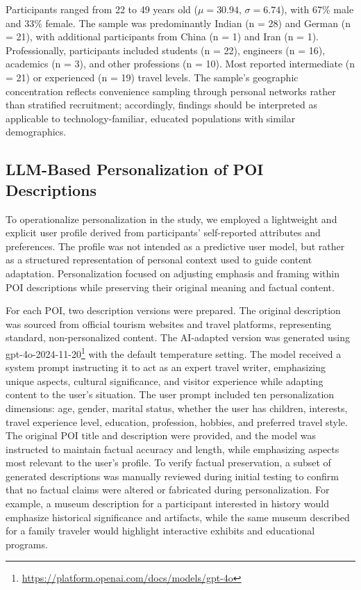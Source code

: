 Participants ranged from 22 to 49 years old ($\mu = 30.94$, $\sigma = 6.74$), with 67\% male and 33\% female. The sample was predominantly Indian (n = 28) and German (n = 21), with additional participants from China (n = 1) and Iran (n = 1). Professionally, participants included students (n = 22), engineers (n = 16), academics (n = 3), and other professions (n = 10). Most reported intermediate (n = 21) or experienced (n = 19) travel levels. The sample's geographic concentration reflects convenience sampling through personal networks rather than stratified recruitment; accordingly, findings should be interpreted as applicable to technology-familiar, educated populations with similar demographics.

\subsection{LLM-Based Personalization of POI Descriptions}
To operationalize personalization in the study, we employed a lightweight and explicit user profile derived from participants’ self-reported attributes and preferences. The profile was not intended as a predictive user model, but rather as a structured representation of personal context used to guide content adaptation. Personalization focused on adjusting emphasis and framing within POI descriptions while preserving their original meaning and factual content.

For each POI, two description versions were prepared. The original description was sourced from official tourism websites and travel platforms, representing standard, non-personalized content. The AI-adapted version was generated using gpt-4o-2024-11-20\footnote{\url{https://platform.openai.com/docs/models/gpt-4o}} with the default temperature setting. The model received a system prompt instructing it to act as an expert travel writer, emphasizing unique aspects, cultural significance, and visitor experience while adapting content to the user's situation. The user prompt included ten personalization dimensions: age, gender, marital status, whether the user has children, interests, travel experience level, education, profession, hobbies, and preferred travel style. The original POI title and description were provided, and the model was instructed to maintain factual accuracy and length, while emphasizing aspects most relevant to the user's profile. To verify factual preservation, a subset of generated descriptions was manually reviewed during initial testing to confirm that no factual claims were altered or fabricated during personalization. For example, a museum description for a participant interested in history would emphasize historical significance and artifacts, while the same museum described for a family traveler would highlight interactive exhibits and educational programs.

